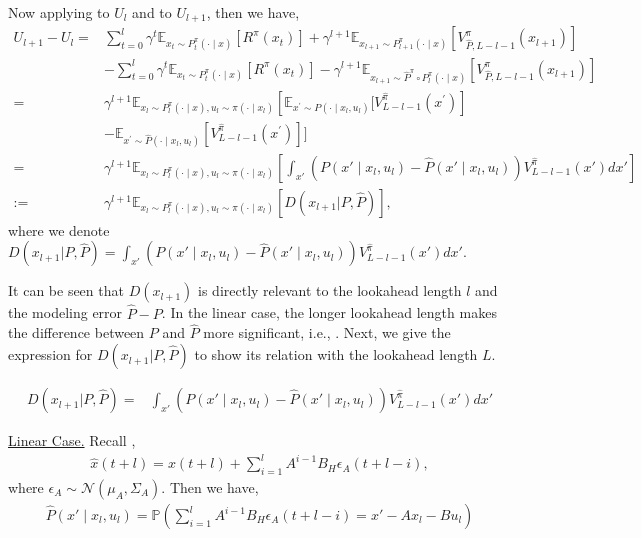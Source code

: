 Now applying  to $U_{l}$ and  to $U_{l+1}$, then we have,
\begin{align*}
U_{l+1}-U_{l}=&
\sum_{t=0}^l \gamma^t \mathbb{E}_{x_t \sim P_t^\pi(\cdot \mid x)}\left[R^\pi\left(x_t\right)\right]+\gamma^{l+1} \mathbb{E}_{x_{l+1} \sim P_{l+1}^\pi(\cdot \mid x)}\left[{V}_{\hat{P}, L-l-1}^\pi\left(x_{l+1}\right)\right]\\
& -\sum_{t=0}^l \gamma^t \mathbb{E}_{x_t \sim P_t^\pi(\cdot \mid x)}\left[R^\pi\left(x_t\right)\right]-\gamma^{l+1} \mathbb{E}_{x_{l+1} \sim \hat{P}^\pi \circ P_l^\pi(\cdot \mid x)}\left[{V}_{\hat{P}, L-l-1}^\pi\left(x_{l+1}\right)\right] \\
= & \gamma^{l+1} \mathbb{E}_{x_l \sim P_l^\pi(\cdot \mid x), u_l \sim \pi\left(\cdot \mid x_l\right)}\left[\mathbb{E}_{x^{\prime} \sim P\left(\cdot \mid x_l, u_l\right)}\Biggl[{V}^{\hat{\pi}}_{L-l-1}\left(x^{\prime}\right)\right]\\
&-\mathbb{E}_{x^{\prime} \sim \hat{P}\left(\cdot \mid x_l, u_l\right)}\left[{V}^{\hat{\pi}}_{L-l-1}\left(x^{\prime}\right)\right]\Biggr]\\
=& \gamma^{l+1} \mathbb{E}_{x_l \sim P_l^\pi(\cdot \mid x), u_l \sim \pi\left(\cdot \mid x_l\right)}\left[
\int_{x'} \left({P}\left(x' \mid x_l, u_l\right)-\hat{P}\left(x' \mid x_l, u_l\right)\right){V}^{\hat{\pi}}_{L-l-1}(x') dx' \right]\\
:=&\gamma^{l+1} \mathbb{E}_{x_l \sim P_l^\pi(\cdot \mid x), u_l \sim \pi\left(\cdot \mid x_l\right)}[D(x_{l+1}\vert P,\hat{P})],
\end{align*}
where we denote $D(x_{l+1}\vert P,\hat{P})=\int_{x'} \left({P}\left(x' \mid x_l, u_l\right)-\hat{P}\left(x' \mid x_l, u_l\right)\right){V}^{\hat{\pi}}_{L-l-1}(x') dx'$.

 It can be seen that $D(x_{l+1})$ is directly relevant to the lookahead length $l$ and the modeling error $\hat{P}-P$. In the linear case, the  longer lookahead length makes the difference between $P$ and $\hat{P}$ more significant, i.e., . Next, we give the expression for $D(x_{l+1}\vert P,\hat{P})$ to show its relation with the lookahead length $L$. 

 \begin{align*}
     D(x_{l+1}\vert P,\hat{P})=&\int_{x'} \left({P}\left(x' \mid x_l, u_l\right)-\hat{P}\left(x' \mid x_l, u_l\right)\right){V}^{\hat{\pi}}_{L-l-1}(x') dx'
 \end{align*}

\underline{Linear Case.} Recall , 
\begin{align*}
    \hat{x}(t+l) = x(t+l) + \sum_{i=1}^{l}A^{i-1}B_H\epsilon_A(t+l-i),
\end{align*}
where $\epsilon_A \sim \mathcal{N}(\mu_A,\Sigma_A)$. Then we have,
\begin{align*}
    \hat{P}\left(x' \mid x_l, u_l\right) = \mathbb{P}(\sum_{i=1}^{l}A^{i-1}B_H\epsilon_A(t+l-i) = x'-Ax_l-Bu_l)
\end{align*}

